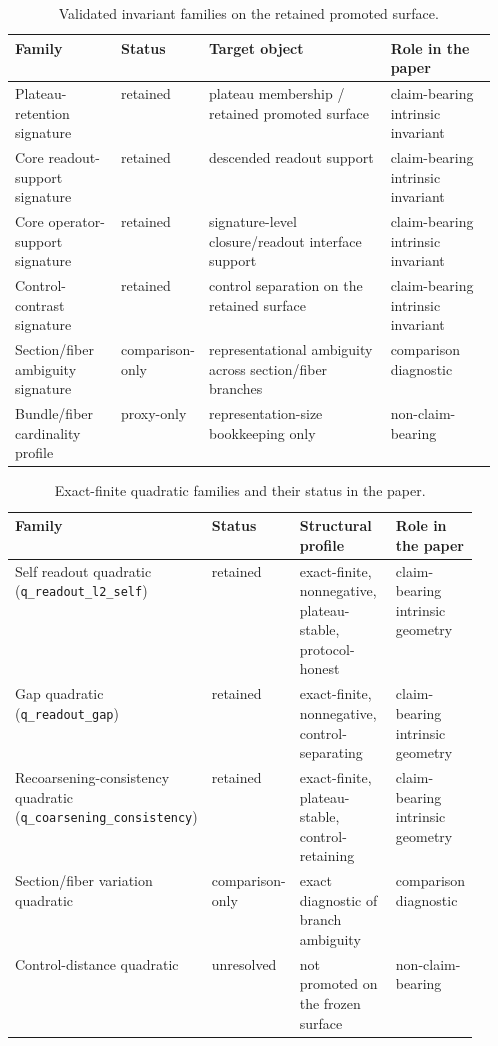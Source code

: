 \documentclass[11pt]{article}
\theoremstyle{definition}
\begin{document}
\begin{table}[t]
\centering
\small
\begin{tabularx}{\linewidth}{@{}>{\raggedright\arraybackslash}p{0.22\linewidth}>{\raggedright\arraybackslash}p{0.12\linewidth}>{\raggedright\arraybackslash}X>{\raggedright\arraybackslash}p{0.22\linewidth}@{}}
\toprule
Family & Status & Target object & Role in the paper \\
\midrule
Plateau-retention signature & retained & plateau membership / retained promoted surface & claim-bearing intrinsic invariant \\
Core readout-support signature & retained & descended readout support & claim-bearing intrinsic invariant \\
Core operator-support signature & retained & signature-level closure/readout interface support & claim-bearing intrinsic invariant \\
Control-contrast signature & retained & control separation on the retained surface & claim-bearing intrinsic invariant \\
Section/fiber ambiguity signature & comparison-only & representational ambiguity across section/fiber branches & comparison diagnostic \\
Bundle/fiber cardinality profile & proxy-only & representation-size bookkeeping only & non-claim-bearing \\
\bottomrule
\end{tabularx}
\caption{Validated invariant families on the retained promoted surface.}
\label{tab:invariant-families}
\end{table}

\begin{table}[t]
\centering
\small
\begin{tabularx}{\linewidth}{@{}>{\raggedright\arraybackslash}p{0.26\linewidth}>{\raggedright\arraybackslash}p{0.10\linewidth}>{\raggedright\arraybackslash}X>{\raggedright\arraybackslash}p{0.18\linewidth}@{}}
\toprule
Family & Status & Structural profile & Role in the paper \\
\midrule
Self readout quadratic (\texttt{q\_readout\_l2\_self}) & retained & exact-finite, nonnegative, plateau-stable, protocol-honest & claim-bearing intrinsic geometry \\
Gap quadratic (\texttt{q\_readout\_gap}) & retained & exact-finite, nonnegative, control-separating & claim-bearing intrinsic geometry \\
Recoarsening-consistency quadratic (\texttt{q\_coarsening\_consistency}) & retained & exact-finite, plateau-stable, control-retaining & claim-bearing intrinsic geometry \\
Section/fiber variation quadratic & comparison-only & exact diagnostic of branch ambiguity & comparison diagnostic \\
Control-distance quadratic & unresolved & not promoted on the frozen surface & non-claim-bearing \\
\bottomrule
\end{tabularx}
\caption{Exact-finite quadratic families and their status in the paper.}
\label{tab:quadratic-families}
\end{table}
\end{document}
